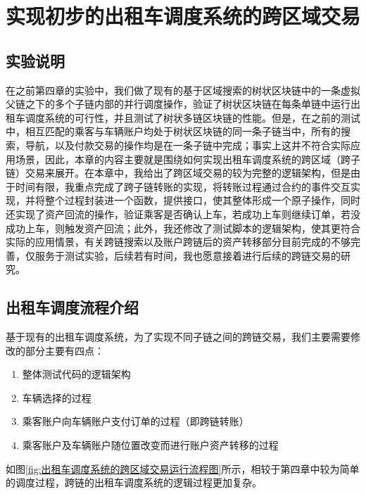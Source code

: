 
\chapter{实现初步的出租车调度系统的跨区域交易}

\section{实验说明}

在之前第四章的实验中，我们做了现有的基于区域搜索的树状区块链中的一条虚拟父链之下的多个子链内部的并行调度操作，验证了树状区块链在每条单链中运行出租车调度系统的可行性，并且测试了树状多链区块链的性能。但是，在之前的测试中，相互匹配的乘客与车辆账户均处于树状区块链的同一条子链当中，所有的搜索，导航，以及付款交易的操作均是在一条子链中完成；事实上这并不符合实际应用场景，因此，本章的内容主要就是围绕如何实现出租车调度系统的跨区域（跨子链）交易来展开。在本章中，我给出了跨区域交易的较为完整的逻辑架构，但是由于时间有限，我重点完成了跨子链转账的实现，将转账过程通过合约的事件交互实现，并将整个过程封装进一个函数，提供接口，使其整体形成一个原子操作，同时还实现了资产回流的操作，验证乘客是否确认上车，若成功上车则继续订单，若没成功上车，则触发资产回流；此外，我还修改了测试脚本的逻辑架构，使其更符合实际的应用情景，有关跨链搜索以及账户跨链后的资产转移部分目前完成的不够完善，仅服务于测试实验，后续若有时间，我也愿意接着进行后续的跨链交易的研究。

\section{出租车调度流程介绍}

基于现有的出租车调度系统，为了实现不同子链之间的跨链交易，我们主要需要修改的部分主要有四点：

\begin{enumerate}
    \item 整体测试代码的逻辑架构
    \item 车辆选择的过程
    \item 乘客账户向车辆账户支付订单的过程（即跨链转账）
    \item 乘客账户及车辆账户随位置改变而进行账户资产转移的过程
\end{enumerate}

如图\ref{fig:出租车调度系统的跨区域交易运行流程图}所示，相较于第四章中较为简单的调度过程，跨链的出租车调度系统的逻辑过程更加复杂。

